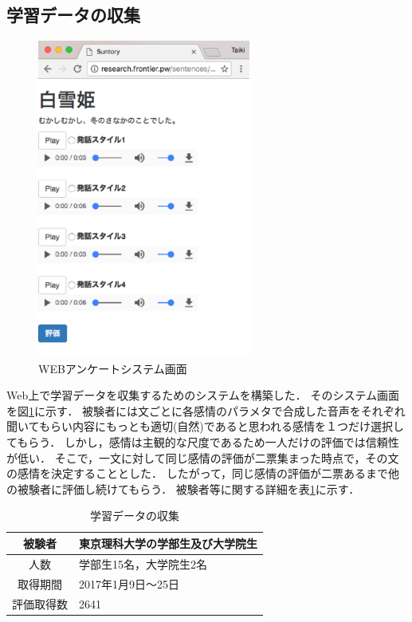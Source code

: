 \subsection{学習データの収集}
\begin{figure}[ht]
  \begin{center}
    \includegraphics[clip,width=7.0cm]{fig/web.eps}
    \caption{WEBアンケートシステム画面}
    \label{fig:web}
  \end{center}
\end{figure}

Web上で学習データを収集するためのシステムを構築した．
そのシステム画面を図\ref{fig:web}に示す．
被験者には文ごとに各感情のパラメタで合成した音声をそれぞれ聞いてもらい内容にもっとも適切(自然)であると思われる感情を１つだけ選択してもらう．
しかし，感情は主観的な尺度であるため一人だけの評価では信頼性が低い．
そこで，一文に対して同じ感情の評価が二票集まった時点で，その文の感情を決定することとした．
したがって，同じ感情の評価が二票あるまで他の被験者に評価し続けてもらう．
被験者等に関する詳細を表\ref{enviroment}に示す．

\begin{table}[ht]
  \begin{center}
  \caption{学習データの収集}
  \label{enviroment}
  \begin{tabular}{|c|l|}
    \hline
    被験者 & 東京理科大学の学部生及び大学院生 \\ \hline
    人数 & 学部生15名，大学院生2名 \\ \hline
    取得期間 & 2017年1月9日〜25日 \\ \hline
    評価取得数 & 2641 \\ \hline
  \end{tabular}
  \end{center}
\end{table}

